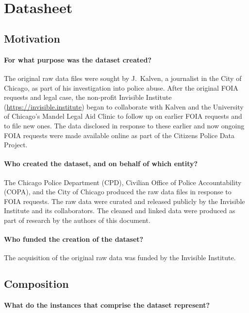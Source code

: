 \section{Datasheet}

\subsection{Motivation}

\paragraph{For what purpose was the dataset created?}
The original raw data files were sought by J.~Kalven, a journalist in the City
of Chicago, as part of his investigation into police abuse. After the original
FOIA requests and legal case, the non-profit Invisible Institute (\url{https://invisible.institute}) 
began to collaborate with Kalven and the University of Chicago's Mandel Legal Aid Clinic
to follow up on earlier FOIA requests and to file new ones. The data disclosed
in response to these earlier and now ongoing FOIA requests were made available
online as part of the Citizens Police Data Project.

\paragraph{Who created the dataset, and on behalf of which entity?}
The Chicago Police Department (CPD), Civilian Office of Police Accountability
(COPA), and the City of Chicago produced the raw data files in response to FOIA
requests. The raw data were curated and released publicly by the Invisible
Institute and its collaborators. The cleaned and linked data were produced
as part of research by the authors of this document.

\paragraph{Who funded the creation of the dataset?}
The acquisition of the original raw data was funded by the Invisible Institute.

\subsection{Composition}

\paragraph{What do the instances that comprise the dataset represent?}


